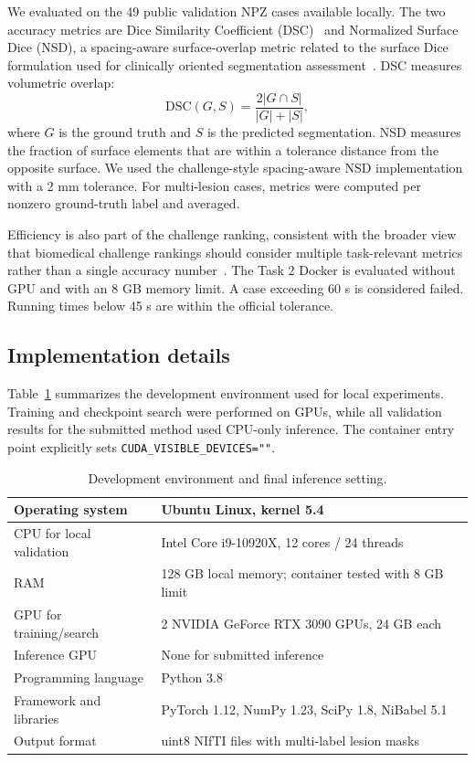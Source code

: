 \documentclass[runningheads]{llncs}
\begin{document}
We evaluated on the 49 public validation NPZ cases available locally. The two accuracy metrics are Dice Similarity Coefficient (DSC)~\cite{Dice1945} and Normalized Surface Dice (NSD), a spacing-aware surface-overlap metric related to the surface Dice formulation used for clinically oriented segmentation assessment~\cite{SurfaceDice}. DSC measures volumetric overlap:
\begin{equation}
\mathrm{DSC}(G,S)=\frac{2|G\cap S|}{|G|+|S|},
\end{equation}
where $G$ is the ground truth and $S$ is the predicted segmentation. NSD measures the fraction of surface elements that are within a tolerance distance from the opposite surface. We used the challenge-style spacing-aware NSD implementation with a 2 mm tolerance. For multi-lesion cases, metrics were computed per nonzero ground-truth label and averaged.

Efficiency is also part of the challenge ranking, consistent with the broader view that biomedical challenge rankings should consider multiple task-relevant metrics rather than a single accuracy number~\cite{ChallengeR}. The Task 2 Docker is evaluated without GPU and with an 8 GB memory limit. A case exceeding 60 s is considered failed. Running times below 45 s are within the official tolerance.

\subsection{Implementation details}
\label{sec:implementation}

Table~\ref{table:env} summarizes the development environment used for local experiments. Training and checkpoint search were performed on GPUs, while all validation results for the submitted method used CPU-only inference. The container entry point explicitly sets \texttt{CUDA\_VISIBLE\_DEVICES=""}.

\begin{table}[!htbp]
\caption{Development environment and final inference setting.}
\label{table:env}
\centering
\begin{tabular}{ll}
\hline
Operating system & Ubuntu Linux, kernel 5.4 \\
\hline
CPU for local validation & Intel Core i9-10920X, 12 cores / 24 threads \\
\hline
RAM & 128 GB local memory; container tested with 8 GB limit \\
\hline
GPU for training/search & 2 NVIDIA GeForce RTX 3090 GPUs, 24 GB each \\
\hline
Inference GPU & None for submitted inference \\
\hline
Programming language & Python 3.8 \\
\hline
Framework and libraries & PyTorch 1.12, NumPy 1.23, SciPy 1.8, NiBabel 5.1 \\
\hline
Output format & uint8 NIfTI files with multi-label lesion masks \\
\hline
\end{tabular}
\end{table}
\end{document}
